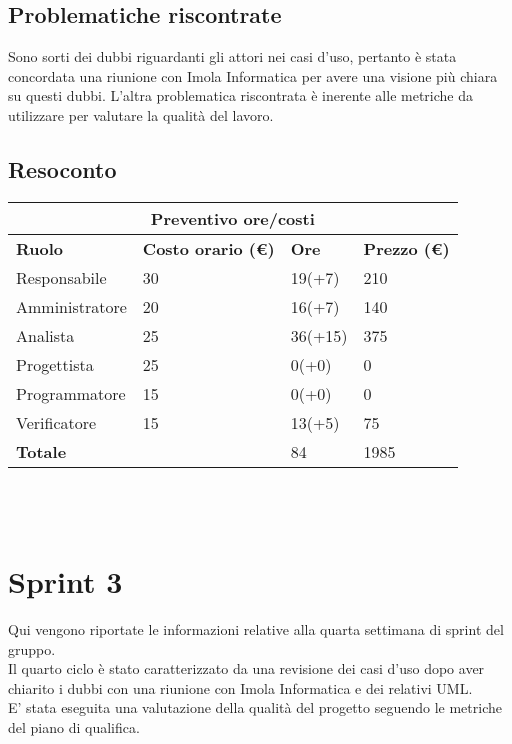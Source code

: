 \documentclass[12pt]{article}
\begin{document}
\subsection{Problematiche riscontrate}
Sono sorti dei dubbi riguardanti gli attori nei casi d'uso, pertanto è stata concordata una riunione con Imola Informatica per avere una visione più chiara su questi dubbi.
L'altra problematica riscontrata è inerente alle metriche da utilizzare per valutare la qualità del lavoro.
\subsection{Resoconto}
\begin{center}
    \begin{tabularx}{\textwidth}{|X|X|X|X|}
        \hline
        \multicolumn{4}{|c|}{\textbf{Preventivo ore/costi}}\\
        \hline
        \hline
        \textbf{Ruolo} & \textbf{Costo orario (\euro)} & \textbf{Ore} & \textbf{Prezzo (\euro)}\\
        \hline
        Responsabile    & 30 & 19(+7)  & 210\\
        \hline
        Amministratore  & 20 & 16(+7)  & 140\\
        \hline
        Analista        & 25 & 36(+15)  & 375\\
        \hline
        Progettista     & 25 & 0(+0)  & 0\\
        \hline
        Programmatore   & 15 & 0(+0)  & 0\\
        \hline
        Verificatore    & 15 & 13(+5)  & 75\\
        \hline
        \hline
        \textbf{Totale} &    & 84 &  1985 \\
        \hline
    \end{tabularx}\\[8pt]
    \mbox{}\\
\end{center}


\section{Sprint 3}
Qui vengono riportate le informazioni relative alla quarta settimana di sprint del gruppo. \\
Il quarto ciclo è stato caratterizzato da una revisione dei casi d'uso dopo aver chiarito i dubbi con una riunione con Imola Informatica e dei relativi UML.\\
E' stata eseguita una valutazione della qualità del progetto seguendo le metriche del piano di qualifica.
\end{document}
